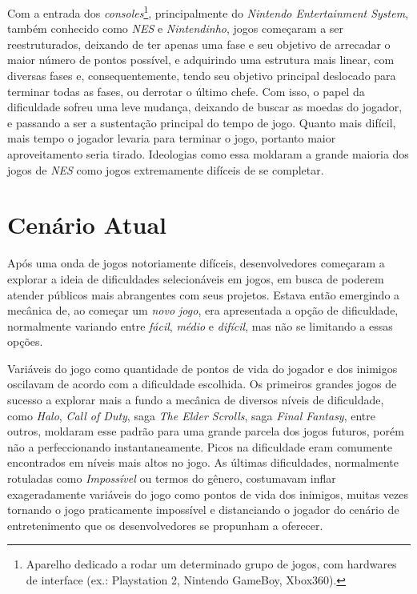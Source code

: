 Com a entrada dos \textit{consoles}\footnote{
    Aparelho dedicado a rodar um determinado grupo de jogos, com hardwares de interface (ex.: Playstation 2, Nintendo GameBoy, Xbox360).
}, principalmente do \textit{Nintendo Entertainment System}, também conhecido como \textit{NES} e \textit{Nintendinho}, jogos começaram a ser reestruturados, deixando de ter apenas uma fase e seu objetivo de arrecadar o maior número de pontos possível, e adquirindo uma estrutura mais linear, com diversas fases e, consequentemente, tendo seu objetivo principal deslocado para terminar todas as fases, ou derrotar o último chefe. Com isso, o papel da dificuldade sofreu uma leve mudança, deixando de buscar as moedas do jogador, e passando a ser a sustentação principal do tempo de jogo. Quanto mais difícil, mais tempo o jogador levaria para terminar o jogo, portanto maior aproveitamento seria tirado. Ideologias como essa moldaram a grande maioria dos jogos de \textit{NES} como jogos extremamente difíceis de se completar.

\section{Cenário Atual}\label{cenario atual}

Após uma onda de jogos notoriamente difíceis, desenvolvedores começaram a explorar a ideia de dificuldades selecionáveis em jogos, em busca de poderem atender públicos mais abrangentes com seus projetos. Estava então emergindo a mecânica de, ao começar um \textit{novo jogo}, era apresentada a opção de dificuldade, normalmente variando entre \textit{fácil}, \textit{médio} e \textit{difícil}, mas não se limitando a essas opções.

Variáveis do jogo como quantidade de pontos de vida do jogador e dos inimigos oscilavam de acordo com a dificuldade escolhida. Os primeiros grandes jogos de sucesso a explorar mais a fundo a mecânica de diversos níveis de dificuldade, como \textit{Halo}, \textit{Call of Duty}, saga \textit{The Elder Scrolls}, saga \textit{Final Fantasy}, entre outros, moldaram esse padrão para uma grande parcela dos jogos futuros, porém não a perfeccionando instantaneamente. Picos na dificuldade eram comumente encontrados em níveis mais altos no jogo. As últimas dificuldades, normalmente rotuladas como \textit{Impossível} ou termos do gênero, costumavam inflar exageradamente variáveis do jogo como pontos de vida dos inimigos, muitas vezes tornando o jogo praticamente impossível e distanciando o jogador do cenário de entretenimento que os desenvolvedores se propunham a oferecer.

